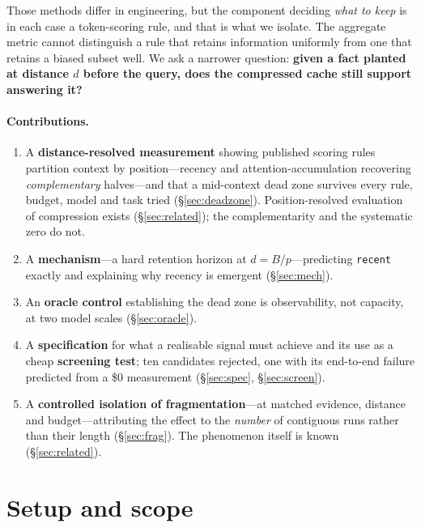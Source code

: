 \documentclass[10pt]{article}
\begin{document}
Those methods differ in engineering, but the component deciding \emph{what to
keep} is in each case a token-scoring rule, and that is what we isolate. The
aggregate metric cannot distinguish a rule that retains information uniformly
from one that retains a biased subset well. We ask a narrower question:
\textbf{given a fact planted at distance $d$ before the query, does the
compressed cache still support answering it?}

\paragraph{Contributions.}
\begin{enumerate}\itemsep2pt
\item A \textbf{distance-resolved measurement} showing published scoring rules
      partition context by position---recency and attention-accumulation
      recovering \emph{complementary} halves---and that a mid-context dead zone
      survives every rule, budget, model and task tried
      (\S\ref{sec:deadzone}). Position-resolved evaluation of compression
      exists (\S\ref{sec:related}); the complementarity and the systematic zero
      do not.
\item A \textbf{mechanism}---a hard retention horizon at $d = B/p$---predicting
      \texttt{recent} exactly and explaining why recency is emergent
      (\S\ref{sec:mech}).
\item An \textbf{oracle control} establishing the dead zone is observability,
      not capacity, at two model scales (\S\ref{sec:oracle}).
\item A \textbf{specification} for what a realisable signal must achieve and
      its use as a cheap \textbf{screening test}; ten candidates rejected, one
      with its end-to-end failure predicted from a \$0 measurement
      (\S\ref{sec:spec}, \S\ref{sec:screen}).
\item A \textbf{controlled isolation of fragmentation}---at matched evidence,
      distance and budget---attributing the effect to the \emph{number} of
      contiguous runs rather than their length (\S\ref{sec:frag}). The
      phenomenon itself is known (\S\ref{sec:related}).
\end{enumerate}

\section{Setup and scope}\label{sec:setup}
\end{document}
